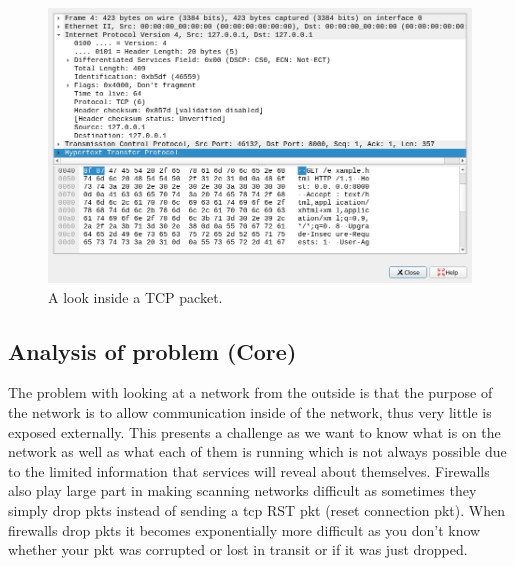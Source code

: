 \documentclass[titlepage]{article}
\let\Oldsubsection\subsection{}
\renewcommand{\subsection}{\FloatBarrier\Oldsubsection}
\begin{document}
\begin{figure}[H]
  \centering
  \includegraphics[width=\textwidth]{screenshots/deconstructed_packet.png}
  \caption{%
    A look inside a TCP packet.
  }\label{deconstructed}
\end{figure}

\lstset{language=HTML}


\subsection{Analysis of problem (Core)}

The problem with looking at a network from the outside is that the purpose of the network is to
allow communication inside of the network, thus very little is exposed externally. This presents
a challenge as we want to know what is on the network as well as what each of them is running which
is not always possible due to the limited information that \glspl{service} will reveal about themselves.
Firewalls also play large part in making scanning networks difficult as sometimes they simply drop
\glspl{pkt} instead of sending a \gls{tcp} RST \gls{pkt} (reset connection \gls{pkt}).
When firewalls drop \glspl{pkt} it becomes exponentially more difficult as you don't know whether
your \gls{pkt} was corrupted or lost in transit or if it was just dropped.
\end{document}
